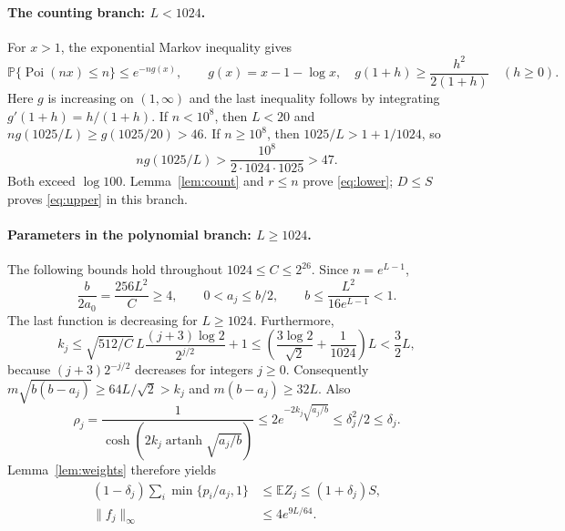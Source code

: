 \documentclass[10pt]{article}
\newcommand{\E}{\mathbb E}
\newcommand{\Prob}{\mathbb P}
\newcommand{\Poi}{\operatorname{Poi}}
\DeclareMathOperator{\artanh}{artanh}
\begin{document}
\paragraph{The counting branch: $L<1024$.}
For $x>1$, the exponential Markov inequality gives
\begin{equation}
 \Prob\{\Poi(nx)\le n\}\le e^{-ng(x)},\qquad
 g(x)=x-1-\log x,\quad
 g(1+h)\ge\frac{h^2}{2(1+h)}\quad(h\ge0).
 \label{eq:chernoff}
\end{equation}
Here $g$ is increasing on $(1,\infty)$ and the last inequality follows by
integrating $g'(1+h)=h/(1+h)$. If $n<10^8$, then $L<20$ and
$ng(1025/L)\ge g(1025/20)>46$. If $n\ge10^8$, then $1025/L>1+1/1024$,
so
\[
 ng(1025/L)>\frac{10^8}{2\cdot1024\cdot1025}>47.
\]
Both exceed $\log100$. Lemma~\ref{lem:count} and $r\le n$ prove
\eqref{eq:lower}; $D\le S$ proves \eqref{eq:upper} in this branch.

\paragraph{Parameters in the polynomial branch: $L\ge1024$.}
The following bounds hold throughout $1024\le C\le2^{26}$.
Since $n=e^{L-1}$,
\begin{equation}
 \frac b{2a_0}=\frac{256L^2}{C}\ge4,\qquad
 0<a_j\le b/2,\qquad b\le\frac{L^2}{16e^{L-1}}<1.
 \label{eq:parameters}
\end{equation}
The last function is decreasing for $L\ge1024$. Furthermore,
\[
 k_j\le\sqrt{512/C}\,L\frac{(j+3)\log2}{2^{j/2}}+1
 \le\left(\frac{3\log2}{\sqrt2}+\frac1{1024}\right)L<\frac32L,
\]
because $(j+3)2^{-j/2}$ decreases for integers $j\ge0$.
Consequently $m\sqrt{b(b-a_j)}\ge64L/\sqrt2>k_j$ and
$m(b-a_j)\ge32L$. Also
\begin{equation}
 \rho_j=\frac1{\cosh(2k_j\artanh\sqrt{a_j/b})}
 \le2e^{-2k_j\sqrt{a_j/b}}\le\delta_j^2/2\le\delta_j.
 \label{eq:rho}
\end{equation}
Lemma~\ref{lem:weights} therefore yields
\begin{align}
 (1-\delta_j)\sum_i\min\{p_i/a_j,1\}
 &\le\E Z_j\le(1+\delta_j)S,\label{eq:means}\\
 \|f_j\|_\infty&\le4e^{9L/64}.\label{eq:uniformnorm}
\end{align}
\end{document}
